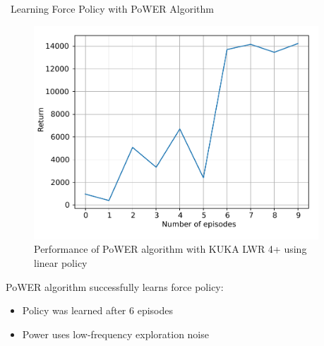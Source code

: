 \documentclass[aspectratio=43,10pt,fleqn,t]{beamer}
\begin{document}
	
\begin{frame}{~}{\small Learning Force Policy with PoWER Algorithm}
	
	\begin{minipage}[t]{0.51\textwidth}
		\begin{figure}
			\includegraphics[width=0.95\textwidth]{images/exp/cut/power_return1n}
			\caption{\scriptsize Performance of PoWER algorithm with KUKA LWR 4+ using linear policy}
		\end{figure}
	\end{minipage}
	\hfill
	\begin{minipage}[t]{0.47\textwidth}
		\scriptsize
		\vspace{0.5cm}
		PoWER algorithm successfully learns force policy:
		\begin{itemize}
			\scriptsize 
			\item Policy was learned after 6 episodes
			\item Power uses low-frequency exploration noise
		\end{itemize}
	\end{minipage}
\end{frame}
\end{document}
